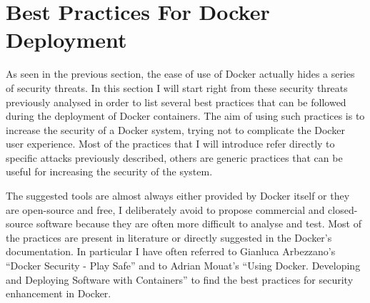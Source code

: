 \documentclass[a4paper,12pt]{article}
\begin{document}




\newpage

\section{Best Practices For Docker Deployment}
\label{sec:best_practices_for_docker_deployment}

As seen in the previous section, the ease of use of Docker actually hides a
series of security threats. In this section I will start right from these
security threats previously analysed in order to list several best practices
that can be followed during the deployment of Docker containers. The aim of
using such practices is to increase the security of a Docker system, trying not
to complicate the Docker user experience. Most of the practices that I will
introduce refer directly to specific attacks previously described, others are
generic practices that can be useful for increasing the security of the system.
\par The suggested tools are almost always either provided by Docker itself or
they are open-source and free, I deliberately avoid to propose commercial and
closed-source software because they are often more difficult to analyse and
test. Most of the practices are present in literature or directly suggested in
the Docker's documentation. In particular I have often referred to Gianluca
Arbezzano's ``Docker Security - Play Safe'' \cite{arbezzano_play_safe} and to
Adrian Mouat's ``Using Docker. Developing and Deploying Software with
Containers'' \cite{mouat_using_docker} to find the best practices for security
enhancement in Docker. 
\end{document}
